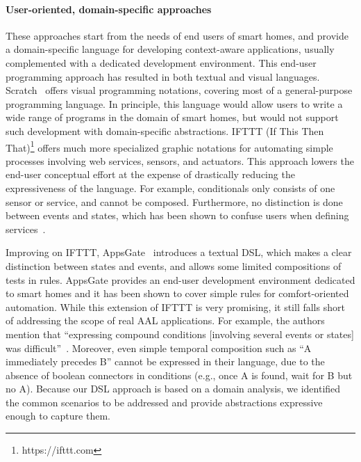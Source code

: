 \paragraph{User-oriented, domain-specific approaches}
These approaches start from the needs of end users of smart homes, and provide a domain-specific language for developing context-aware applications, usually complemented with a dedicated development environment.  This end-user programming approach has resulted in both textual and visual languages. Scratch~\cite{Resnick:2009:SP:1592761.1592779} offers visual programming notations, covering most of a general-purpose programming language. In principle, this language would allow users to write a wide range of programs in the domain of smart homes, but would not support such development with domain-specific abstractions. IFTTT (If This Then That)\footnote{https://ifttt.com}
offers much more specialized graphic notations for automating simple processes involving web services, sensors, and actuators. This approach lowers the end-user conceptual effort at the expense of drastically reducing the expressiveness of the language. For example, conditionals only consists of one sensor or service, and cannot be composed. Furthermore, no distinction is done between events and states, which has been shown to confuse users when defining services~\cite{Huang:2015:SMM:2750858.2805830}.

Improving on IFTTT, AppsGate~\cite{coutaz2016first} introduces a textual DSL, which makes a clear distinction between states and events, and allows some limited compositions of tests in rules. AppsGate provides an end-user development environment dedicated to smart homes and it has been shown to cover simple rules for comfort-oriented automation. While this extension of IFTTT is very promising, it still falls short of addressing the scope of real AAL applications. For example, the authors mention that ``expressing compound conditions [involving several events or states] was difficult''~\cite[p.13]{coutaz2016first}. Moreover, even simple temporal composition such as ``A immediately precedes B'' cannot be expressed in their language, due to the absence of boolean connectors in conditions (e.g., once A is found, wait for B but no A). Because our DSL approach is based on a domain analysis, we identified the common scenarios to be addressed and provide abstractions expressive enough to capture them.


